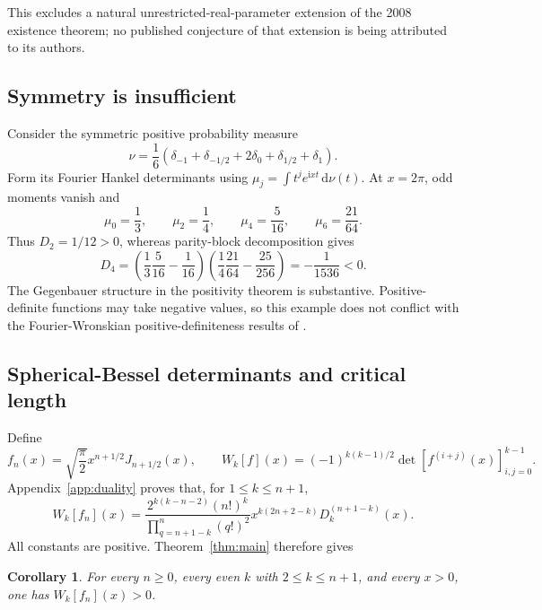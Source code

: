 \documentclass[11pt]{article}
\numberwithin{equation}{section}
\newtheorem{corollary}[theorem]{Corollary}
\theoremstyle{remark}
\newcommand{\ii}{\mathrm{i}}
\newcommand{\dd}{\,\mathrm{d}}
\begin{document}
This excludes a natural unrestricted-real-parameter extension of the
2008 existence theorem; no published conjecture of that extension is
being attributed to its authors.

\subsection{Symmetry is insufficient}

Consider the symmetric positive probability measure
\[
 \nu=\frac16(\delta_{-1}+\delta_{-1/2}+2\delta_0+
                         \delta_{1/2}+\delta_1).
\]
Form its Fourier Hankel determinants using
$\mu_j=\int t^je^{\ii xt}\dd\nu(t)$. At $x=2\pi$, odd moments
vanish and
\[
       \mu_0=\frac13,\qquad \mu_2=\frac14,
       \qquad\mu_4=\frac5{16},\qquad\mu_6=\frac{21}{64}.
\]
Thus $D_2=1/12>0$, whereas parity-block decomposition gives
\begin{equation}\label{eq:atomic}
 D_4=\left(\frac13\frac5{16}-\frac1{16}\right)
       \left(\frac14\frac{21}{64}-\frac{25}{256}\right)
     =-\frac1{1536}<0.
\end{equation}
The Gegenbauer structure in the positivity theorem is substantive.
Positive-definite functions may take negative values, so this example
does not conflict with the Fourier-Wronskian positive-definiteness
results of \cite{DimitrovXu2019}.

\subsection{Spherical-Bessel determinants and critical length}

Define
\begin{equation}\label{eq:fW}
 f_n(x)=\sqrt{\frac\pi2}x^{n+1/2}J_{n+1/2}(x),\qquad
 W_k[f](x)=(-1)^{k(k-1)/2}
                      \det[f^{(i+j)}(x)]_{i,j=0}^{k-1}.
\end{equation}
Appendix~\ref{app:duality} proves that, for $1\le k\le n+1$,
\begin{equation}\label{eq:dualitymain}
 W_k[f_n](x)=
 \frac{2^{k(k-n-2)}(n!)^k}
      {\displaystyle\prod_{q=n+1-k}^{n}(q!)^2}
 x^{k(2n+2-k)}D_k^{(n+1-k)}(x).
\end{equation}
All constants are positive. Theorem~\ref{thm:main} therefore gives
\begin{corollary}\label{cor:evenW}
For every $n\ge0$, every even $k$ with $2\le k\le n+1$, and every
$x>0$, one has $W_k[f_n](x)>0$.
\end{corollary}
\end{document}
